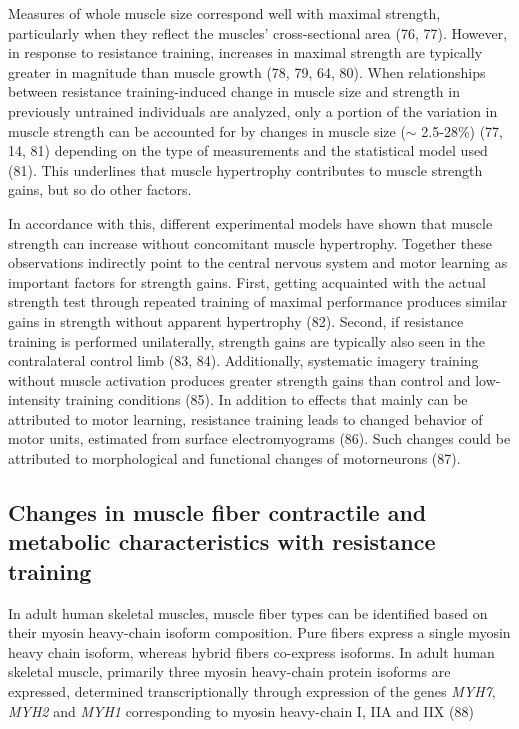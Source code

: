 \documentclass[twoside,10pt]{gihclass} %
\begin{document}
Measures of whole muscle size correspond well with maximal strength, particularly when they reflect the muscles' cross-sectional area
(76, 77).
However, in response to resistance training, increases in maximal strength are typically greater in magnitude than muscle growth
(78, 79, 64, 80).
When relationships between resistance training-induced change in muscle size and strength in previously untrained individuals are analyzed, only a portion of the variation in muscle strength can be accounted for by changes in muscle size (\(\sim\) 2.5-28\%)
(77, 14, 81)
depending on the type of measurements and the statistical model used
(81).
This underlines that muscle hypertrophy contributes to muscle strength gains, but so do other factors.

In accordance with this, different experimental models have shown that muscle strength can increase without concomitant muscle hypertrophy.
Together these observations indirectly point to the central nervous system and motor learning as important factors for strength gains.
First, getting acquainted with the actual strength test through repeated training of maximal performance produces similar gains in strength without apparent hypertrophy
(82).
Second, if resistance training is performed unilaterally, strength gains are typically also seen in the contralateral control limb
(83, 84).
Additionally, systematic imagery training without muscle activation produces greater strength gains than control and low-intensity training conditions
(85).
In addition to effects that mainly can be attributed to motor learning, resistance training leads to changed behavior of motor units, estimated from surface electromyograms
(86).
Such changes could be attributed to morphological and functional changes of motorneurons
(87).

\hypertarget{changes-in-muscle-fiber-contractile-and-metabolic-characteristics-with-resistance-training}{%
\subsection{Changes in muscle fiber contractile and metabolic characteristics with resistance training}\label{changes-in-muscle-fiber-contractile-and-metabolic-characteristics-with-resistance-training}}

In adult human skeletal muscles, muscle fiber types can be identified based on their myosin heavy-chain isoform composition. Pure fibers express a single myosin heavy chain isoform, whereas hybrid fibers co-express isoforms.
In adult human skeletal muscle, primarily three myosin heavy-chain protein isoforms are expressed, determined transcriptionally through expression of the genes \emph{MYH7}, \emph{MYH2} and \emph{MYH1} corresponding to myosin heavy-chain I, IIA and IIX
(88)
\end{document}
